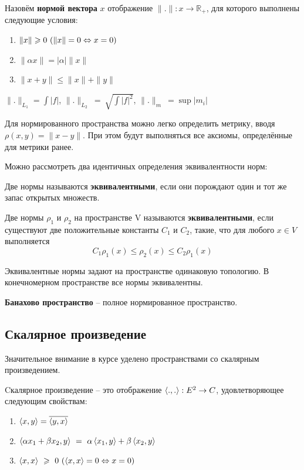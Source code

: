 \documentclass[12pt]{article}
\begin{document}
	\begin{defi}
		Назовём \textbf{нормой вектора} $x$ отображение $\|.\| : x \rightarrow \mathbb{R_+}$, для которого выполнены следующие условия:
		\begin{enumerate}
			\item $\|x\| \geqslant 0 ~(\|x\| = 0 \Leftrightarrow x = 0)$
			\item $\|\alpha x\| = |\alpha| \|x\|$
			\item $\|x + y\| \leq \|x\| + \|y\|$
		\end{enumerate}
	\end{defi}
	
	\example $\|.\|_{L_1} = \int {|f|}$, $\|.\|_{L_2} ~=~ \sqrt{\int {|f|^2}}$,  $\|.\|_{m} ~= \sup {|m_i|}$
	
	Для нормированного пространства можно легко определить метрику, вводя $\rho(x,y) = \|x-y\|$. При этом будут выполняться все аксиомы,
	определённые для метрики ранее.
	
	Можно рассмотреть два идентичных определения эквивалентности норм:
	
	\begin{defi}
		Две нормы называются \textbf{эквивалентными}, если они порождают один и тот же запас открытых множеств.
	\end{defi}
	
	\begin{defi}
		Две нормы $\rho_1$ и $\rho_2$ на пространстве V называются \textbf{эквивалентными}, если существуют две положительные константы 
		$C_1$ и $C_2$, такие, что для любого $x \in V$ выполняется 
		$$C_1 \rho_1(x) \leq \rho_2(x) \leq C_2 \rho_1(x)$$
	\end{defi}
	Эквивалентные нормы задают на пространстве одинаковую топологию. В конечномерном пространстве все нормы эквивалентны.
	
	\begin{defi}
		\textbf{Банахово пространство} -- полное нормированное пространство.
	\end{defi}
	
	\subsection{Скалярное произведение}

	Значительное внимание в курсе уделено пространствами со скалярным произведением.

	\begin{defi}
		Cкалярное произведение -- это отображение $\left\langle ., . \right\rangle : E^2 \rightarrow C$, удовлетворяющее следующим свойствам:
		\begin{enumerate} 
			\item $\left\langle x, y \right\rangle = \overline{\left\langle y, x \right\rangle}$
			\item $\left\langle \alpha x_1 + \beta x_2, y \right\rangle ~= ~\alpha \left\langle x_1, y \right\rangle + \beta \left\langle x_2, y \right\rangle$
			\item $\left\langle x, x \right\rangle ~\geqslant ~0 ~(\left\langle x, x \right\rangle = 0 \Leftrightarrow x = 0)$
		\end{enumerate}
	\end{defi}
\end{document}
